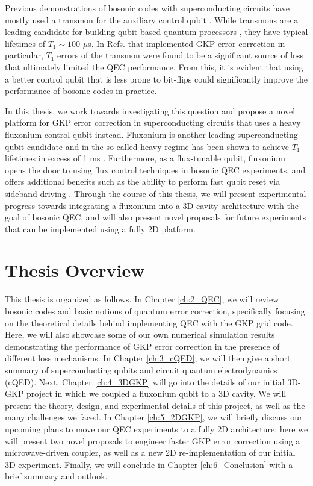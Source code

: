 Previous demonstrations of bosonic codes with superconducting circuits have mostly used a transmon \cite{koch2007charge} for the auxiliary control qubit \cite{ofek2016extending, hu2019quantum, gertler2021protecting, campagne2020gkp-expt, sivak2023gkp-expt, nordquantique2023gkp-expt}. While transmons are a leading candidate for building qubit-based quantum processors \cite{krantz2019quantum, kjaergaard2020superconducting}, they have typical lifetimes of $T_1 \sim 100$ $\mu$s. In Refs. \cite{campagne2020gkp-expt, sivak2023gkp-expt, nordquantique2023gkp-expt} that implemented GKP error correction in particular, $T_1$ errors of the transmon were found to be a significant source of loss that ultimately limited the QEC performance. From this, it is evident that using a better control qubit that is less prone to bit-flips could significantly improve the performance of bosonic codes in practice. 

In this thesis, we work towards investigating this question and propose a novel platform for GKP error correction in superconducting circuits that uses a heavy fluxonium control qubit instead. Fluxonium is another leading superconducting qubit candidate and in the so-called heavy regime has been shown to achieve $T_1$ lifetimes in excess of 1 ms \cite{earnest2018realization, lin2018demonstration, zhang2021universal, ding2023FTF}. Furthermore, as a flux-tunable qubit, fluxonium opens the door to using flux control techniques in bosonic QEC experiments, and offers additional benefits such as the ability to perform fast qubit reset via sideband driving \cite{najera2024high, nie2024parametrically}. Through the course of this thesis, we will present experimental progress towards integrating a fluxonium into a 3D cavity architecture with the goal of bosonic QEC, and will also present novel proposals for future experiments that can be implemented using a fully 2D platform. 

\section{Thesis Overview}
This thesis is organized as follows. In Chapter \ref{ch:2_QEC}, we will review bosonic codes and basic notions of quantum error correction, specifically focusing on the theoretical details behind implementing QEC with the GKP grid code. Here, we will also showcase some of our own numerical simulation results demonstrating the performance of GKP error correction in the presence of different loss mechanisms. In Chapter \ref{ch:3_cQED}, we will then give a short summary of superconducting qubits and circuit quantum electrodynamics (cQED). Next, Chapter \ref{ch:4_3DGKP} will go into the details of our initial 3D-GKP project in which we coupled a fluxonium qubit to a 3D cavity. We will present the theory, design, and experimental details of this project, as well as the many challenges we faced. In Chapter \ref{ch:5_2DGKP}, we will briefly discuss our upcoming plans to move our QEC experiments to a fully 2D architecture; here we will present two novel proposals to engineer faster GKP error correction using a microwave-driven coupler, as well as a new 2D re-implementation of our initial 3D experiment. Finally, we will conclude in Chapter \ref{ch:6_Conclusion} with a brief summary and outlook.


